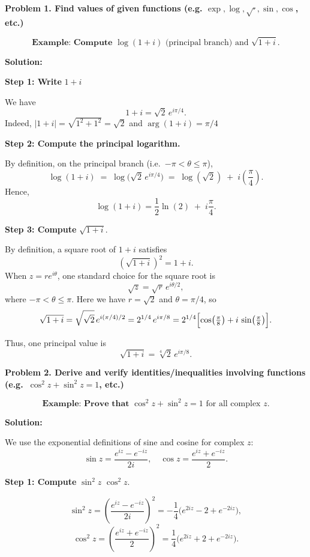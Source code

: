 \documentclass[12pt]{article}
\title{}
\author{Jerich Lee}
\date{\today}
\theoremstyle{definition} %
\theoremstyle{plain} %
\begin{document}
\maketitle


\textbf{Problem 1. Find values of given functions (e.g. $\exp, \log, \sqrt{\cdot}, \sin, \cos$, etc.)}

\[
\textbf{Example: Compute } \log(1+i) \text{ (principal branch) and } \sqrt{1+i}.
\]

\textbf{Solution:}

\textbf{Step 1: Write } $1+i$ 

We have 
\[
1+i = \sqrt{2}\, e^{i\pi/4}.
\]
Indeed, $|1+i| = \sqrt{1^2 + 1^2} = \sqrt{2}$ and 
$\arg(1+i) = \pi/4$ 

\textbf{Step 2: Compute the principal logarithm.}

By definition, on the principal branch (i.e.\ $-\pi < \theta \le \pi$),
\[
\log(1+i) \;=\; \log\bigl(\sqrt{2} \, e^{i\pi/4}\bigr) \;=\; \log(\sqrt{2}) \;+\; i\left(\frac{\pi}{4}\right).
\]
Hence,
\[
\log(1+i) = \frac{1}{2}\ln(2) \;+\; i \frac{\pi}{4}.
\]

\textbf{Step 3: Compute} $\sqrt{1+i}$.

By definition, a square root of $1 + i$ satisfies
\[
(\sqrt{1+i})^2 = 1 + i.
\]
When $z = r e^{i\theta}$, one standard choice for the square root is
\[
\sqrt{z} = \sqrt{r}\, e^{i\theta/2},
\]
where $-\pi < \theta \le \pi$. Here we have $r = \sqrt{2}$ and $\theta = \pi/4$, so
\[
\sqrt{1+i} = \sqrt{\sqrt{2}}\, e^{i(\pi/4)/2} 
= 2^{1/4}\, e^{i\pi/8} 
= 2^{1/4}\Bigl[\cos\bigl(\tfrac{\pi}{8}\bigr) + i\,\sin\bigl(\tfrac{\pi}{8}\bigr)\Bigr].
\]

Thus, one principal value is
\[
\sqrt{1+i} = \sqrt[4]{2}\, e^{i\pi/8}.
\]

\textbf{Problem 2. Derive and verify identities/inequalities involving functions (e.g.\ $\cos^2 z + \sin^2 z = 1$, etc.)}

\[
\textbf{Example: Prove that } \cos^2 z + \sin^2 z = 1 \text{ for all complex } z.
\]

\textbf{Solution:}

We use the exponential definitions of sine and cosine for complex $z$:
\[
\sin z = \frac{e^{iz} - e^{-iz}}{2i}, 
\quad
\cos z = \frac{e^{iz} + e^{-iz}}{2}.
\]

\textbf{Step 1: Compute } $\sin^2 z$  $\cos^2 z$.

\[
\sin^2 z = \left(\frac{e^{iz} - e^{-iz}}{2i}\right)^2 
= -\frac{1}{4}\bigl(e^{2iz} - 2 + e^{-2iz}\bigr),
\]
\[
\cos^2 z = \left(\frac{e^{iz} + e^{-iz}}{2}\right)^2 
= \frac{1}{4}\bigl(e^{2iz} + 2 + e^{-2iz}\bigr).
\]
\end{document}
